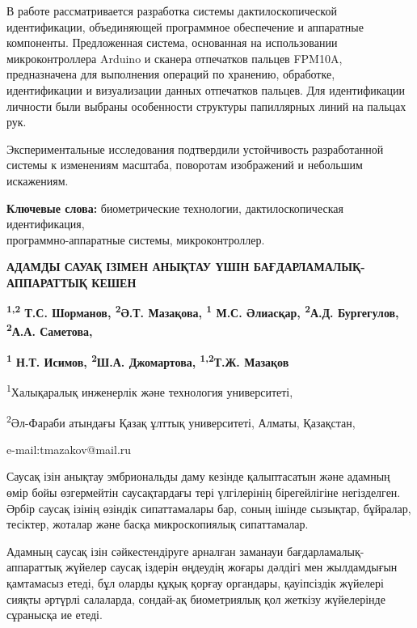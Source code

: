 В работе рассматривается разработка системы дактилоскопической
идентификации, объединяющей программное обеспечение и аппаратные
компоненты. Предложенная система, основанная на использовании
микроконтроллера Arduino и сканера отпечатков пальцев FPM10A,
предназначена для выполнения операций по хранению, обработке,
идентификации и визуализации данных отпечатков пальцев. Для
идентификации личности были выбраны особенности структуры папиллярных
линий на пальцах рук.

Экспериментальные исследования подтвердили устойчивость разработанной
системы к изменениям масштаба, поворотам изображений и небольшим
искажениям.

{\bfseries Ключевые слова:} биометрические технологии, дактилоскопическая
идентификация, \\программно-аппаратные системы, микроконтроллер.

\begin{articleheader}
{\bfseries АДАМДЫ САУАҚ ІЗІМЕН АНЫҚТАУ ҮШІН БАҒДАРЛАМАЛЫҚ-АППАРАТТЫҚ КЕШЕН}

{\bfseries \textsuperscript{1,2} Т.С. Шорманов, \textsuperscript{2}Ә.Т.
Мазақова, \textsuperscript{1} М.С. Әлиасқар, \textsuperscript{2}А.Д.
Бургегулов, \textsuperscript{2}А.А. Саметова,}

{\bfseries \textsuperscript{1} Н.Т. Исимов, \textsuperscript{2}Ш.А.
Джомартова, \textsuperscript{1,2}Т.Ж. Мазақов\textsuperscript{\envelope }}
\end{articleheader}

\begin{affiliation}
\textsuperscript{1}Халықаралық инженерлік және технология университеті,

\textsuperscript{2}Әл-Фараби атындағы Қазақ ұлттық университеті, Алматы,
Қазақстан,

e-mail:tmazakov@mail.ru
\end{affiliation}

Саусақ ізін анықтау эмбриональды даму кезінде қалыптасатын және адамның
өмір бойы өзгермейтін саусақтардағы тері үлгілерінің бірегейлігіне
негізделген. Әрбір саусақ ізінің өзіндік сипаттамалары бар, соның ішінде
сызықтар, бұйралар, тесіктер, жоталар және басқа микроскопиялық
сипаттамалар.

Адамның саусақ ізін сәйкестендіруге арналған заманауи
бағдарламалық-аппараттық жүйелер саусақ іздерін өңдеудің жоғары дәлдігі
мен жылдамдығын қамтамасыз етеді, бұл оларды құқық қорғау органдары,
қауіпсіздік жүйелері сияқты әртүрлі салаларда, сондай-ақ биометриялық
қол жеткізу жүйелерінде сұранысқа ие етеді.

